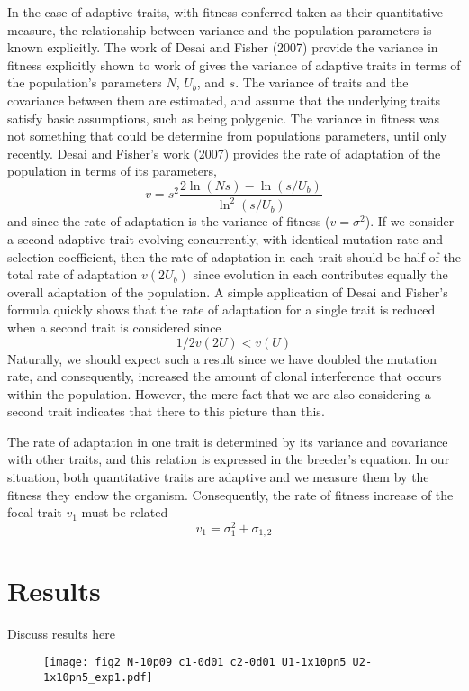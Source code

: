 \documentclass[11pt,one column]{article}
\begin{document}
\begin{multicols}{2}
In the case of adaptive traits, with fitness conferred taken as their quantitative measure, the relationship between variance and the population parameters is known explicitly. The work of Desai and Fisher (2007) provide the variance in fitness explicitly shown to work of gives the variance of adaptive traits in terms of the population’s parameters $N$, $U_b$, and $s$. The variance of traits and the covariance between them are estimated, and assume that the underlying traits satisfy basic assumptions, such as being polygenic. The variance in fitness was not something that could be determine from populations parameters, until only recently. Desai and Fisher’s work (2007) provides the rate of adaptation of the population in terms of its parameters,
\begin{equation} 
v =s^2  \frac{2 \ln(Ns)-\ln(s/U_b)}{\ln^2(s/U_b)}
\end{equation}  
and since the rate of adaptation is the variance of fitness ($v=\sigma^2$).  If we consider a second adaptive trait evolving concurrently, with identical mutation rate and selection coefficient, then the rate of adaptation in each trait should be half of the total rate of adaptation $v(2U_b)$ since evolution in each contributes equally the overall adaptation of the population. A simple application of Desai and Fisher’s formula quickly shows that the rate of adaptation for a single trait is reduced when a second trait is considered since
\[ 1/2  v(2U)<v(U) \]
Naturally, we should expect such a result since we have doubled the mutation rate, and consequently, increased the amount of clonal interference that occurs within the population. However, the mere fact that we are also considering a second trait indicates that there to this picture than this.\par

The rate of adaptation in one trait is determined by its variance and covariance with other traits, and this relation is expressed in the breeder’s equation. In our situation, both quantitative traits are adaptive and we measure them by the fitness they endow the organism. Consequently, the rate of fitness increase of the focal trait $v_1$ must be related
\begin{equation}
v_1=\sigma_1^2+\sigma_{1,2}
\end{equation}

\section*{Results}
Discuss results here
\begin{figure}
\texttt{[image: fig2\_N-10p09\_c1-0d01\_c2-0d01\_U1-1x10pn5\_U2-1x10pn5\_exp1.pdf]}
\end{figure}

\end{multicols}
\end{document}

